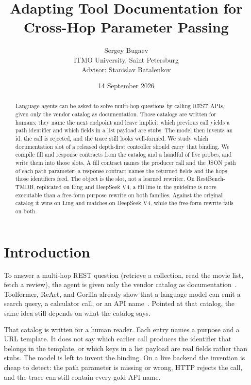 \documentclass[11pt,a4paper]{article}
\title{Adapting Tool Documentation for Cross-Hop Parameter Passing}
\author{%
Sergey Bugaev\\
ITMO University, Saint Petersburg\\[0.85em]
{\small Advisor: Stanislav Batalenkov}%
}
\date{14 September 2026}
\begin{document}
\maketitle

\begin{abstract}
Language agents can be asked to solve multi-hop questions by calling REST APIs, given only the vendor catalog as documentation. Those catalogs are written for humans: they name the next endpoint and leave implicit which previous call yields a path identifier and which fields in a list payload are stubs. The model then invents an id, the call is rejected, and the trace still looks well-formed. We study which documentation slot of a released depth-first controller should carry that binding. We compile fill and response contracts from the catalog and a handful of live probes, and write them into those slots. A fill contract names the producer call and the JSON path of each path parameter; a response contract names the returned fields and the hops those identifiers feed. The object is the slot, not a learned rewriter. On RestBench-TMDB, replicated on Ling and DeepSeek V4, a fill line in the guideline is more executable than a free-form purpose rewrite on both families. Against the original catalog it wins on Ling and matches on DeepSeek V4, while the free-form rewrite fails on both.
\end{abstract}

\section{Introduction}

To answer a multi-hop REST question (retrieve a collection, read the movie list, fetch a review), the agent is given only the vendor catalog as documentation~\cite{song2023restgpt,qin2024toollm}. Toolformer, ReAct, and Gorilla already show that a language model can emit a search query, a calculator call, or an API name~\cite{schick2023toolformer,yao2023react,patil2024gorilla}. Pointed at that catalog, the same idea still depends on what the catalog says.

That catalog is written for a human reader. Each entry names a purpose and a URL template. It does not say which earlier call produces the identifier that belongs in the template, or which keys in a list payload are real fields rather than stubs. The model is left to invent the binding. On a live backend the invention is cheap to detect: the path parameter is missing or wrong, HTTP rejects the call, and the trace can still contain every gold API name.
\end{document}
